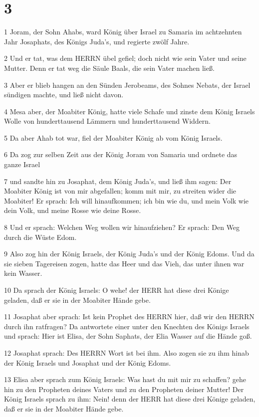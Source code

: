 \chapter{3}

\par 1 Joram, der Sohn Ahabs, ward König über Israel zu Samaria im achtzehnten Jahr Josaphats, des Königs Juda's, und regierte zwölf Jahre.
\par 2 Und er tat, was dem HERRN übel gefiel; doch nicht wie sein Vater und seine Mutter. Denn er tat weg die Säule Baals, die sein Vater machen ließ.
\par 3 Aber er blieb hangen an den Sünden Jerobeams, des Sohnes Nebats, der Israel sündigen machte, und ließ nicht davon.
\par 4 Mesa aber, der Moabiter König, hatte viele Schafe und zinste dem König Israels Wolle von hunderttausend Lämmern und hunderttausend Widdern.
\par 5 Da aber Ahab tot war, fiel der Moabiter König ab vom König Israels.
\par 6 Da zog zur selben Zeit aus der König Joram von Samaria und ordnete das ganze Israel
\par 7 und sandte hin zu Josaphat, dem König Juda's, und ließ ihm sagen: Der Moabiter König ist von mir abgefallen; komm mit mir, zu streiten wider die Moabiter! Er sprach: Ich will hinaufkommen; ich bin wie du, und mein Volk wie dein Volk, und meine Rosse wie deine Rosse.
\par 8 Und er sprach: Welchen Weg wollen wir hinaufziehen? Er sprach: Den Weg durch die Wüste Edom.
\par 9 Also zog hin der König Israels, der König Juda's und der König Edoms. Und da sie sieben Tagereisen zogen, hatte das Heer und das Vieh, das unter ihnen war kein Wasser.
\par 10 Da sprach der König Israels: O wehe! der HERR hat diese drei Könige geladen, daß er sie in der Moabiter Hände gebe.
\par 11 Josaphat aber sprach: Ist kein Prophet des HERRN hier, daß wir den HERRN durch ihn ratfragen? Da antwortete einer unter den Knechten des Königs Israels und sprach: Hier ist Elisa, der Sohn Saphats, der Elia Wasser auf die Hände goß.
\par 12 Josaphat sprach: Des HERRN Wort ist bei ihm. Also zogen sie zu ihm hinab der König Israels und Josaphat und der König Edoms.
\par 13 Elisa aber sprach zum König Israels: Was hast du mit mir zu schaffen? gehe hin zu den Propheten deines Vaters und zu den Propheten deiner Mutter! Der König Israels sprach zu ihm: Nein! denn der HERR hat diese drei Könige geladen, daß er sie in der Moabiter Hände gebe.

